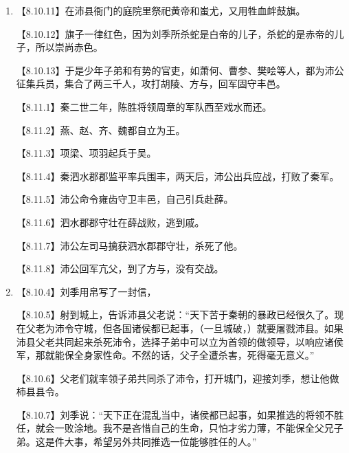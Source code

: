 \documentclass[fontset=none,11pt,a4paper]{ctexart}
\begin{document}
\begin{enumerate}[label=\Alph*.]
\noindent 【8.26.2】背弃原来的约定，改立沛公为汉王，在巴、蜀、汉中称玉，建都南郑。\par
\noindent 【8.26.3】把关中瓜分为三，封立秦朝的三个将领：章邯为雍王，建都废丘：司马欣为塞王，建都栎阳；董翳为翟王，建都高奴。\par
\noindent 【8.26.4】封楚将瑕丘申阳为河南王，建都洛阳。\par
\noindent 【8.26.5】封赵将司马印为殷王，建都朝歌。\par
\noindent 【8.26.6】赵王歇迁徙代地称王。\par
\noindent 【8.26.7】封赵将张耳为常山王，建都襄国。\par
  \item
\noindent 【8.10.11】在沛县衙门的庭院里祭祀黄帝和蚩尤，又用牲血衅鼓旗。\par
\noindent 【8.10.12】旗子一律红色，因为刘季所杀蛇是白帝的儿子，杀蛇的是赤帝的儿子，所以崇尚赤色。\par
\noindent 【8.10.13】于是少年子弟和有势的官吏，如萧何、曹参、樊哙等人，都为沛公征集兵员，集合了两三千人，攻打胡陵、方与，回军固守丰邑。\par
\noindent 【8.11.1】秦二世二年，陈胜将领周章的军队西至戏水而还。\par
\noindent 【8.11.2】燕、赵、齐、魏都自立为王。\par
\noindent 【8.11.3】项梁、项羽起兵于吴。\par
\noindent 【8.11.4】秦泗水郡郡监平率兵围丰，两天后，沛公出兵应战，打败了秦军。\par
\noindent 【8.11.5】沛公命令雍齿守卫丰邑，自己引兵赴薛。\par
\noindent 【8.11.6】泗水郡郡守壮在薛战败，逃到戚。\par
\noindent 【8.11.7】沛公左司马擒获泗水郡郡守壮，杀死了他。\par
\noindent 【8.11.8】沛公回军亢父，到了方与，没有交战。\par
  \item
\noindent 【8.10.4】刘季用帛写了一封信，\par
\noindent 【8.10.5】射到城上，告诉沛县父老说：“天下苦于秦朝的暴政已经很久了。现在父老为沛令守城，但各国诸侯都已起事，（一旦城破，）就要屠戮沛县。如果沛县父老共同起来杀死沛令，选择子弟中可以立为首领的做领导，以响应诸侯军，那就能保全身家性命。不然的话，父子全遭杀害，死得毫无意义。”\par
\noindent 【8.10.6】父老们就率领子弟共同杀了沛令，打开城门，迎接刘季，想让他做柿县县令。\par
\noindent 【8.10.7】刘季说：“天下正在混乱当中，诸侯都已起事，如果推选的将领不胜任，就会一败涂地。我不是吝惜自己的生命，只怕才劣力薄，不能保全父兄子弟。这是件大事，希望另外共同推选一位能够胜任的人。”\par

\end{enumerate}
\end{document}
